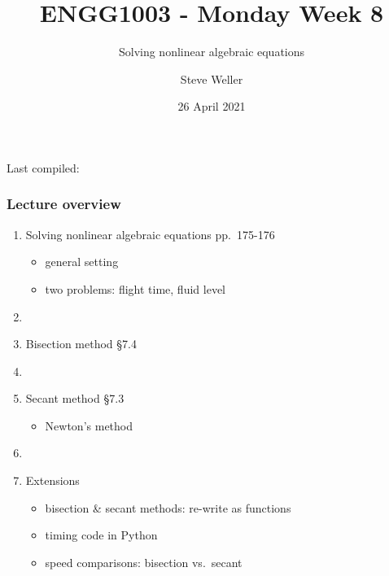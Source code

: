 \documentclass[english,14pt]{beamer}
\title{ENGG1003 - Monday Week 8}
\subtitle{Solving nonlinear algebraic equations }%
\author{Steve Weller}
\institute{University of Newcastle}
\date{26 April 2021}
\newcommand\red[1]{{\color{red} #1}}
\begin{document}
\begin{flushleft}
{\scriptsize Last compiled:~\DTMnow}
\vspace*{-5mm}
\end{flushleft}
\framebreak


\begin{frame}[fragile]

\frametitle{Lecture overview}
\begin{enumerate}
	\item Solving nonlinear algebraic equations \red{pp.~175-176}
	\begin{itemize}
		\item general setting
		\item two problems: flight time, fluid level
	\end{itemize}
	
	\item[]
	
	\item Bisection method \red{\S7.4}
	
	\item[]
	
	\item Secant method \red{\S7.3}
	\begin{itemize}
		\item Newton's method
	\end{itemize}
	
	\item[]
	
	\item Extensions
	\begin{itemize}
		\item bisection \& secant methods: re-write as functions
		\item timing code in Python
		\item speed comparisons: bisection vs.~secant
	\end{itemize}
	
\end{enumerate}

\end{frame}

\end{document}
